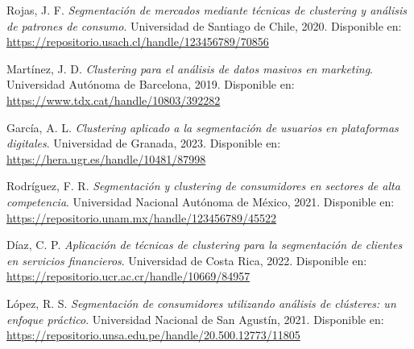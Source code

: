 \documentclass[12pt]{book}
\begin{document}
\begin{thebibliography}{15}
		Rojas, J. F. \textit{Segmentación de mercados mediante técnicas de clustering y análisis de patrones de consumo}. Universidad de Santiago de Chile, 2020.  
		Disponible en: \url{https://repositorio.usach.cl/handle/123456789/70856}
		
		Martínez, J. D. \textit{Clustering para el análisis de datos masivos en marketing}. Universidad Autónoma de Barcelona, 2019.  
		Disponible en: \url{https://www.tdx.cat/handle/10803/392282}
		
		García, A. L. \textit{Clustering aplicado a la segmentación de usuarios en plataformas digitales}. Universidad de Granada, 2023.  
		Disponible en: \url{https://hera.ugr.es/handle/10481/87998}
		
		Rodríguez, F. R. \textit{Segmentación y clustering de consumidores en sectores de alta competencia}. Universidad Nacional Autónoma de México, 2021.  
		Disponible en: \url{https://repositorio.unam.mx/handle/123456789/45522}
		
		Díaz, C. P. \textit{Aplicación de técnicas de clustering para la segmentación de clientes en servicios financieros}. Universidad de Costa Rica, 2022.  
		Disponible en: \url{https://repositorio.ucr.ac.cr/handle/10669/84957}
		
		López, R. S. \textit{Segmentación de consumidores utilizando análisis de clústeres: un enfoque práctico}. Universidad Nacional de San Agustín, 2021.  
		Disponible en: \url{https://repositorio.unsa.edu.pe/handle/20.500.12773/11805}
		
	\end{thebibliography}
	
	
\end{document}
